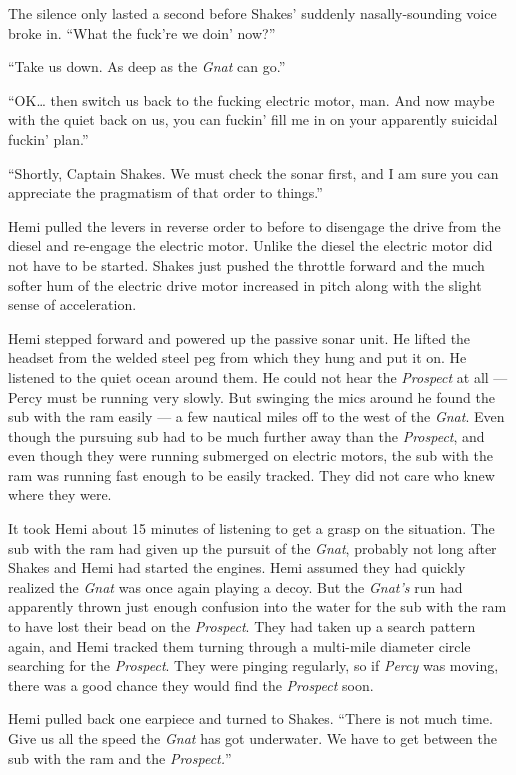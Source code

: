 \documentclass[]{scrbook}
\begin{document}
The silence only lasted a second before Shakes' suddenly
nasally-sounding voice broke in. ``What the fuck're we doin' now?''

``Take us down. As deep as the \emph{Gnat} can go.''

``OK\ldots{} then switch us back to the fucking electric motor, man. And
now maybe with the quiet back on us, you can fuckin' fill me in on your
apparently suicidal fuckin' plan.''

``Shortly, Captain Shakes. We must check the sonar first, and I am sure
you can appreciate the pragmatism of that order to things.''

Hemi pulled the levers in reverse order to before to disengage the drive
from the diesel and re-engage the electric motor. Unlike the diesel the
electric motor did not have to be started. Shakes just pushed the
throttle forward and the much softer hum of the electric drive motor
increased in pitch along with the slight sense of acceleration.

Hemi stepped forward and powered up the passive sonar unit. He lifted
the headset from the welded steel peg from which they hung and put it
on. He listened to the quiet ocean around them. He could not hear the
\emph{Prospect} at all --- Percy must be running very slowly. But
swinging the mics around he found the sub with the ram easily --- a few
nautical miles off to the west of the \emph{Gnat}. Even though the
pursuing sub had to be much further away than the \emph{Prospect}, and
even though they were running submerged on electric motors, the sub with
the ram was running fast enough to be easily tracked. They did not care
who knew where they were.

It took Hemi about 15 minutes of listening to get a grasp on the
situation. The sub with the ram had given up the pursuit of the
\emph{Gnat}, probably not long after Shakes and Hemi had started the
engines. Hemi assumed they had quickly realized the \emph{Gnat} was once
again playing a decoy. But the \emph{Gnat's} run had apparently thrown
just enough confusion into the water for the sub with the ram to have
lost their bead on the \emph{Prospect}. They had taken up a search
pattern again, and Hemi tracked them turning through a multi-mile
diameter circle searching for the \emph{Prospect}. They were pinging
regularly, so if \emph{Percy} was moving, there was a good chance they
would find the \emph{Prospect} soon.

Hemi pulled back one earpiece and turned to Shakes. ``There is not much
time. Give us all the speed the \emph{Gnat} has got underwater. We have
to get between the sub with the ram and the \emph{Prospect.}''
\end{document}
